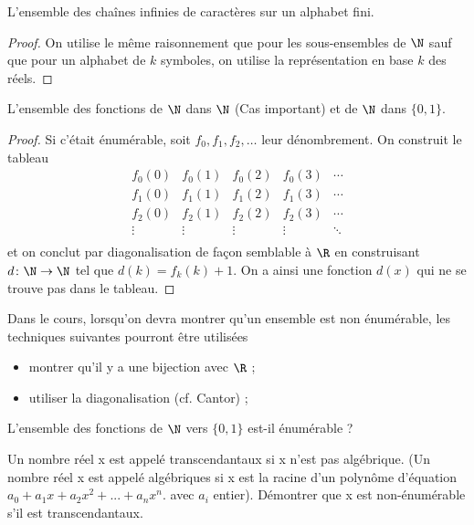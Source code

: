 \begin{myexem}
\begin{myexem}
 L'ensemble des chaînes infinies de caractères sur un alphabet fini.
 \begin{proof}
   On utilise le même raisonnement que pour les sous-ensembles de $\N$ sauf que pour un alphabet de $k$ symboles,
   on utilise la représentation en base $k$ des réels.
 \end{proof}
\end{myexem}

\begin{myexem}
  \label{exem:fNN}
 L'ensemble des fonctions de $\N$ dans $\N$ (Cas important) et de $\N$ dans $\{0, 1\}$.
 \begin{proof}
   Si c'était énumérable, soit $f_0, f_1, f_2, \ldots$ leur dénombrement.
   On construit le tableau
   \[
     \begin{array}{ccccc}
       f_0(0) & f_0(1) & f_0(2) & f_0(3) & \cdots\\
       f_1(0) & f_1(1) & f_1(2) & f_1(3) & \cdots\\
       f_2(0) & f_2(1) & f_2(2) & f_2(3) & \cdots\\
       \vdots & \vdots & \vdots & \vdots & \ddots\\
     \end{array}
   \]
   et on conclut par diagonalisation de façon semblable à $\R$
   en construisant $d\colon \N \to \N$ tel que $d(k) = f_k(k)+1$.
   On a ainsi une fonction $d(x)$ qui ne se trouve pas dans le tableau.
 \end{proof}
\end{myexem}

Dans le cours, lorsqu'on devra montrer qu'un ensemble est non énumérable,
les techniques suivantes pourront être utilisées
\begin{itemize}
	\item montrer qu'il y a une bijection avec $\R$ ;
	\item utiliser la diagonalisation (cf. Cantor) ;
\end{itemize}

\begin{myexercice}\label{exerc:conceptfct}
L'ensemble des fonctions de $\N$ vers $\{0,1\}$ est-il énumérable ?
\end{myexercice}


\begin{myexercice} \label{exerc:ensembleNonEnumNumTranscendantaux}
Un nombre réel x est appelé transcendantaux si x n'est pas algébrique. (Un nombre réel x est appelé algébriques si x est la racine d'un polynôme d'équation $a_0 + a_1x + a_2x^2 + ... + a_nx^n$.  avec $a_i$ entier).
Démontrer que x est non-énumérable s'il est transcendantaux.
\end{myexercice}


\end{myexem}
